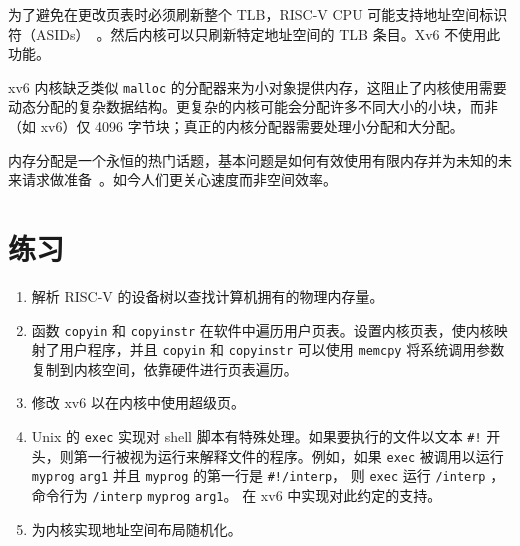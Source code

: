 为了避免在更改页表时必须刷新整个 TLB，RISC-V CPU 可能支持地址空间标识符（ASIDs）~\cite{riscv:priv}。然后内核可以只刷新特定地址空间的 TLB 条目。Xv6 不使用此功能。

xv6 内核缺乏类似 {\tt malloc} 的分配器来为小对象提供内存，这阻止了内核使用需要动态分配的复杂数据结构。更复杂的内核可能会分配许多不同大小的小块，而非（如 xv6）仅 4096 字节块；真正的内核分配器需要处理小分配和大分配。

内存分配是一个永恒的热门话题，基本问题是如何有效使用有限内存并为未知的未来请求做准备~\cite{knuth}。如今人们更关心速度而非空间效率。
\section{练习}

\begin{enumerate}

\item 解析 RISC-V 的设备树以查找计算机拥有的物理内存量。

\item 函数 {\tt copyin} 和 {\tt copyinstr} 在软件中遍历用户页表。设置内核页表，使内核映射了用户程序，并且 {\tt copyin} 和 {\tt copyinstr} 可以使用 {\tt memcpy} 将系统调用参数复制到内核空间，依靠硬件进行页表遍历。

\item 修改 xv6 以在内核中使用超级页。

\item Unix 的
\lstinline{exec}
实现对 shell 脚本有特殊处理。如果要执行的文件以文本
\lstinline{#!}
开头，则第一行被视为运行来解释文件的程序。例如，如果
\lstinline{exec}
被调用以运行
\lstinline{myprog}
\lstinline{arg1}
并且
\lstinline{myprog}
的第一行是
\lstinline{#!/interp}，
则
\lstinline{exec}
运行
\lstinline{/interp}
，命令行为
\lstinline{/interp}
\lstinline{myprog}
\lstinline{arg1}。
在 xv6 中实现对此约定的支持。

\item 为内核实现地址空间布局随机化。

\end{enumerate}
